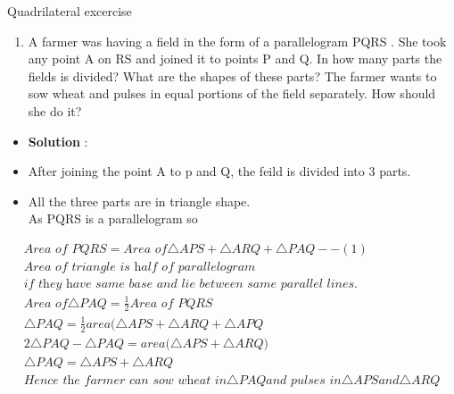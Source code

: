 \begin{frame}{Quadrilateral excercise}
\begin{enumerate}
\conti
\item A farmer was having a field in the form of a
parallelogram PQRS . She took any point A on
RS and joined it to points P and Q. In how
many parts the fields is divided? What are the
shapes of these parts? The farmer wants to sow
wheat and pulses in equal portions of the field
separately. How should she do it?
\seti
\end{enumerate}
\begin{itemize}
\item \textbf{Solution} :
\end{itemize}
\begin{center}

\end{center}
\end{frame}
\begin{frame}
\begin{itemize}
\item  After joining the point A to p and Q, the feild is divided into 3 parts.\\
\item All the three parts are in triangle shape.\\
As PQRS is a parallelogram so\\
\end{itemize}
\begin{align*}
\textit{Area of PQRS} = \textit{Area of} \triangle{APS} + \triangle{ARQ} + \triangle{PAQ} --(1)\\
\textit{Area of triangle is half of parallelogram}\\\textit{if they have same base and lie between same parallel lines}. \\
\textit{Area of} \triangle{PAQ} = \frac{1}{2} \textit{Area of PQRS}\\
\triangle{PAQ} = \frac{1}{2}\textit{area}(\triangle{APS} + \triangle{ARQ} + \triangle{APQ}\\
2\triangle{PAQ} - \triangle{PAQ} = \textit{area(}\triangle{APS} + \triangle{ARQ}\textit{)}\\
\triangle{PAQ} = \triangle{APS} + \triangle{ARQ}\\
\textit{Hence the farmer can sow wheat in} \triangle{PAQ} \textit{and pulses in} \triangle{APS} and \triangle{ARQ}\\
\end{align*}
\end{frame}
